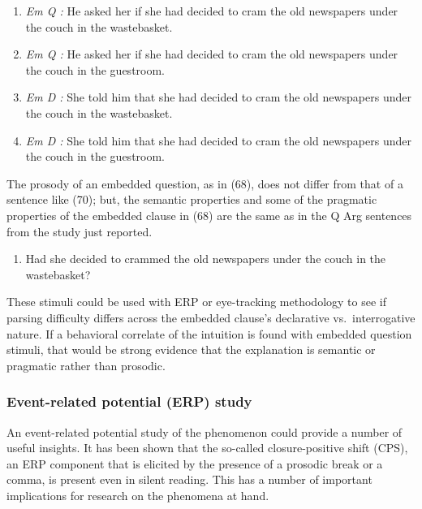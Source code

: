 \documentclass[12pt,oneside]{book}
\providecommand{\tightlist}{%
  \setlength{\itemsep}{0pt}\setlength{\parskip}{0pt}}
\begin{document}
\begin{enumerate}
\def\labelenumi{(\arabic{enumi})}
\setcounter{enumi}{67}
\item
  \emph{Em Q :} He asked her if she had decided to cram the old newspapers under the couch in the wastebasket.
\item
  \emph{Em Q :} He asked her if she had decided to cram the old newspapers under the couch in the guestroom.
\item
  \emph{Em D :} She told him that she had decided to cram the old newspapers under the couch in the wastebasket.
\item
  \emph{Em D :} She told him that she had decided to cram the old newspapers under the couch in the guestroom.
\end{enumerate}

The prosody of an embedded question, as in (68), does not differ from that of a sentence like (70); but, the semantic properties and some of the pragmatic properties of the embedded clause in (68) are the same as in the Q Arg sentences from the study just reported.

\begin{enumerate}
\def\labelenumi{(\arabic{enumi})}
\setcounter{enumi}{71}
\tightlist
\item
  Had she decided to crammed the old newspapers under the couch in the wastebasket?
\end{enumerate}

These stimuli could be used with ERP or eye-tracking methodology to see if parsing difficulty differs across the embedded clause's declarative vs.~interrogative nature. If a behavioral correlate of the intuition is found with embedded question stimuli, that would be strong evidence that the explanation is semantic or pragmatic rather than prosodic.

\hypertarget{erp}{%
\subsubsection{Event-related potential (ERP) study}\label{erp}}

An event-related potential study of the phenomenon could provide a number of useful insights. It has been shown that the so-called closure-positive shift (CPS), an ERP component that is elicited by the presence of a prosodic break or a comma, is present even in silent reading. This has a number of important implications for research on the phenomena at hand.
\end{document}
